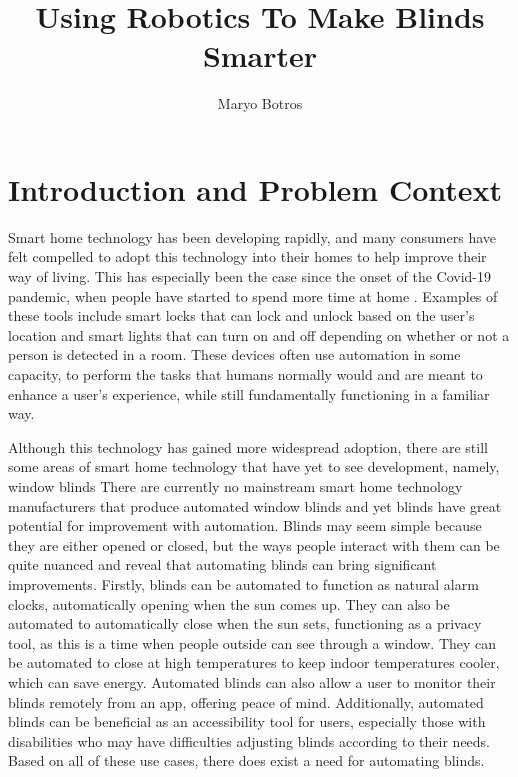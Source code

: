 \documentclass[10pt,twocolumn]{article}
\title{Using Robotics To Make Blinds Smarter}
\author{Maryo Botros}
\affiliation{Occidental College}
\begin{document}
\maketitle

\section{Introduction and Problem Context}

Smart home technology has been developing rapidly, and many consumers have felt compelled to adopt this technology into their homes to help improve their way of living. This has especially been the case since the onset of the Covid-19 pandemic, when people have started to spend more time at home \cite{Ghosh2021SmartHomeDevice}. Examples of these tools include smart locks that can lock and unlock based on the user's location and smart lights that can turn on and off depending on whether or not a person is detected in a room. These devices often use automation in some capacity, to perform the tasks that humans normally would and are meant to enhance a user’s experience, while still fundamentally functioning in a familiar way.

Although this technology has gained more widespread adoption, there are still some areas of smart home technology that have yet to see development, namely, window blinds There are currently no mainstream smart home technology manufacturers that produce automated window blinds and yet blinds have great potential for improvement with automation. Blinds may seem simple because they are either opened or closed, but the ways people interact with them can be quite nuanced and reveal that automating blinds can bring significant improvements. Firstly, blinds can be automated to function as natural alarm clocks, automatically opening when the sun comes up. They can also be automated to automatically close when the sun sets, functioning as a privacy tool, as this is a time when people outside can see through a window. They can be automated to close at high temperatures to keep indoor temperatures cooler, which can save energy. Automated blinds can also allow a user to monitor their blinds remotely from an app, offering peace of mind. Additionally, automated blinds can be beneficial as an accessibility tool for users, especially those with disabilities who may have difficulties adjusting blinds according to their needs. Based on all of these use cases, there does exist a need for automating blinds.
\end{document}
